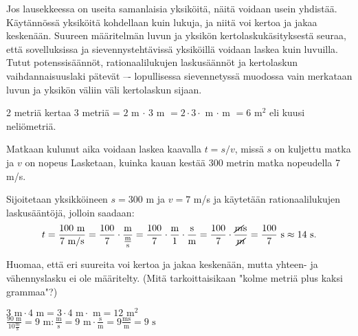 Jos lausekkeessa on useita samanlaisia yksiköitä, näitä voidaan usein yhdistää. Käytännössä yksiköitä kohdellaan kuin lukuja, ja niitä voi kertoa ja jakaa keskenään. Suureen määritelmän luvun ja yksikön kertolaskukäsityksestä seuraa, että sovelluksissa ja sievennystehtävissä yksiköillä voidaan laskea kuin luvuilla. Tutut potenssisäännöt, rationaalilukujen laskusäännöt ja kertolaskun vaihdannaisuuslaki pätevät –- lopullisessa sievennetyssä muodossa vain merkataan luvun ja yksikön väliin väli kertolaskun sijaan.

\begin{esimerkki}
2 metriä kertaa 3 metriä = $2$ m $\cdot$ $3$ m $=2 \cdot 3 \cdot$ m $\cdot$ m $=6 $ m$^2$ eli kuusi neliömetriä.
\end{esimerkki}

\begin{esimerkki}
Matkaan kulunut aika voidaan laskea kaavalla $t=s/v$, missä $s$ on kuljettu matka ja $v$ on nopeus Lasketaan, kuinka kauan kestää 300 metrin matka nopeudella 7 m/s.

Sijoitetaan yksikköineen $s=300$ m ja $v= 7$ m/s ja käytetään rationaalilukujen laskusääntöjä, jolloin saadaan:
\begin{equation*}
t=\frac{100 \textrm{ m}}{ 7 \textrm{ m/s}} = \frac{100}{7} \cdot \frac{\textrm{m}}{\frac{\textrm{m}}{\textrm{s}}} 
= \frac{100}{7} \cdot \frac{\textrm{m}}{1} \cdot \frac{\textrm{s}}{\textrm{m}}
= \frac{100}{7} \cdot \frac{\cancel{m}\textrm{s}}{\cancel{m}}
=\frac{100}{7} \textrm{ s} \approx 14 \textrm{ s}.
\end{equation*}
\end{esimerkki}


Huomaa, että eri suureita voi kertoa ja jakaa keskenään, mutta yhteen- ja vähennyslasku ei ole määritelty. (Mitä tarkoittaisikaan "kolme metriä plus kaksi grammaa"?)

\begin{esimerkki}
$3 \textrm{ m} \cdot 4 \textrm{ m} = 3\cdot 4 \textrm{ m}\cdot \textrm{ m} = 12 \textrm{ m}^2$ \\
$\frac{90 \textrm{ m}}{10 \frac{\textrm{m}}{\textrm{s}}} %
=9 \textrm{ m}:\frac{\textrm{m}}{\textrm{s}}=9 \textrm{ m} \cdot \frac{\textrm{s}}{\textrm{m}} = 9 \frac{\textrm{ms}}{\textrm{m}}=9 \textrm{ s}$
\end{esimerkki}

